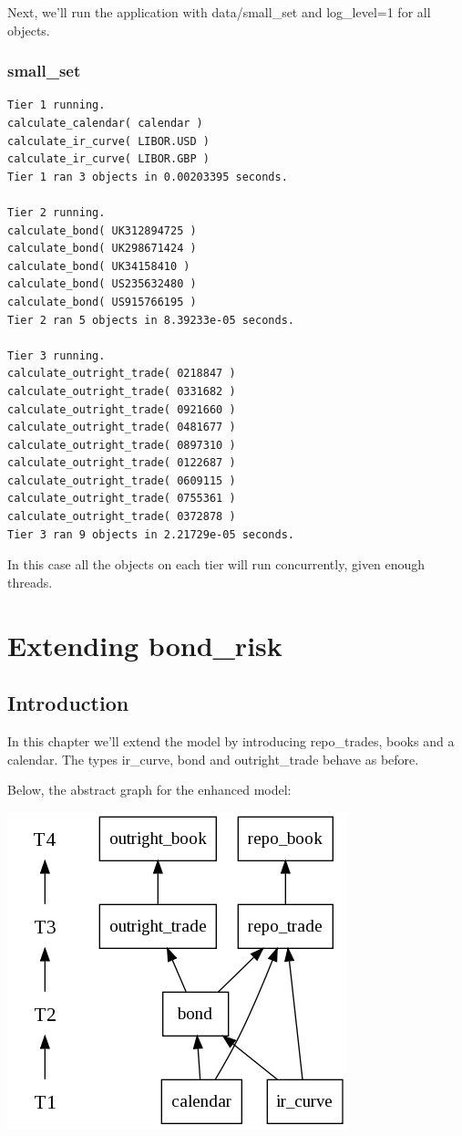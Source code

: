 \documentclass{report}
\begin{document}
Next, we'll run the application with data/small_set and log_level=1 for all objects.

\subsection{small_set}

\begin{verbatim}
Tier 1 running.
calculate_calendar( calendar )
calculate_ir_curve( LIBOR.USD )
calculate_ir_curve( LIBOR.GBP )
Tier 1 ran 3 objects in 0.00203395 seconds.

Tier 2 running.
calculate_bond( UK312894725 )
calculate_bond( UK298671424 )
calculate_bond( UK34158410 )
calculate_bond( US235632480 )
calculate_bond( US915766195 )
Tier 2 ran 5 objects in 8.39233e-05 seconds.

Tier 3 running.
calculate_outright_trade( 0218847 )
calculate_outright_trade( 0331682 )
calculate_outright_trade( 0921660 )
calculate_outright_trade( 0481677 )
calculate_outright_trade( 0897310 )
calculate_outright_trade( 0122687 )
calculate_outright_trade( 0609115 )
calculate_outright_trade( 0755361 )
calculate_outright_trade( 0372878 )
Tier 3 ran 9 objects in 2.21729e-05 seconds.
\end{verbatim}

In this case all the objects on each tier will run concurrently, given enough threads.

\chapter{Extending bond_risk}

\section{Introduction}

In this chapter we'll extend the model by introducing repo_trades, books and a calendar. The types ir_curve, bond and outright_trade behave as before.

Below, the abstract graph for the enhanced model:

\includegraphics[scale=0.5]{bondriskabstract.png} 
\end{document}
